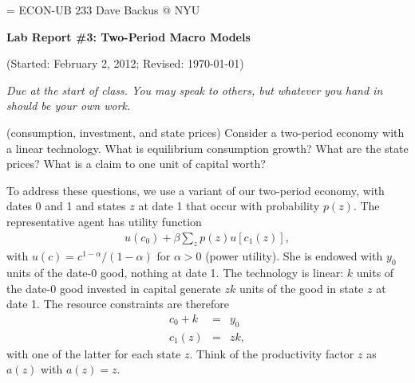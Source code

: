 \documentclass[11pt]{exam}
\begin{document}
\parskip=\bigskipamount
\parindent=0.0in
\thispagestyle{empty}
{\large ECON-UB 233 \hfill Dave Backus @ NYU}

\bigskip\bigskip
\centerline{\Large \bf Lab Report \#3: Two-Period Macro Models}
\centerline{(Started: February 2, 2012; Revised: \today)}

\bigskip
{\it Due at the start of class.
You may speak to others, but whatever you hand in should be your own work.}

\begin{questions}


\question (consumption, investment, and state prices)
Consider a two-period economy with a linear technology.
What is equilibrium consumption growth?
What are the state prices?
What is a claim to one unit of capital worth?

To address these questions,
we use a variant of our two-period economy,
with dates 0 and 1 and states $z$ at date 1 that occur with probability $p(z)$.
The representative agent has utility function
\begin{eqnarray*}
    u(c_0) + \beta \sum_z p(z) u[c_1(z)] ,
\end{eqnarray*}
with $u(c) = c^{1-\alpha}/(1-\alpha)$ for $\alpha > 0$
(power utility).
She is endowed with $y_0$ units of the date-0 good, nothing at date 1.
The technology is linear:  $k$ units of the date-0 good invested in capital
generate $z k$ units of the good in state $z$ at date 1.
The resource constraints are therefore
\begin{eqnarray*}
    c_0 + k &=& y_0  \\
    c_1(z) &=& z k ,
\end{eqnarray*}
with one of the latter for each state $z$.
Think of the productivity factor $z$ as $a(z)$ with $a(z) = z$.

\end{questions}
\end{document}
